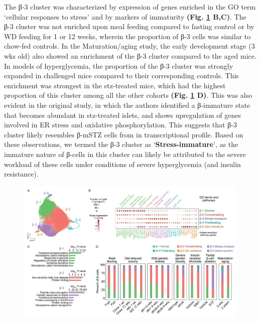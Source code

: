 The β-3 cluster was characterized by expression of genes enriched in the GO term `cellular responses to stress' and by markers of immaturity \textbf{(Fig. \ref{fig:3-4} B,C)}. The β-3 cluster was not enriched upon meal feeding compared to fasting control or by WD feeding for 1 or 12 weeks, wherein the proportion of β-3 cells was similar to chow-fed controls. In the Maturation/aging study, the early development stage (3 wks old) also showed an enrichment of the β-3 cluster compared to the aged mice. In models of hyperglycemia, the proportion of the β-3 cluster was strongly expanded in challenged mice compared to their corresponding controls. This enrichment was strongest in the \gls{stz}-treated mice, which had the highest proportion of this cluster among all the other cohorts \textbf{(Fig. \ref{fig:3-4} D)}. This was also evident in the original study, in which the authors identified a β-immature state that becomes abundant in \gls{stz}-treated islets, and shows upregulation of genes involved in ER stress and oxidative phosphorylation. This suggests that β-3 cluster likely resembles β-mSTZ cells from \textbf{\cite{sachs_targeted_2020}} in transcriptional profile. Based on these observations, we termed the β-3 cluster as ‘\textbf{Stress-immature}’, as the immature nature of β-cells in this cluster can likely be attributed to the severe workload of these cells under conditions of severe hyperglycemia (and insulin resistance).\\

\begin{figure}[t]
\centering
\includegraphics[width=\linewidth]{Chapter5/Fig/F3-1-v2-03.png}
\caption[Characterization of β-cell heterogeneity using subset-
enriched markers]{}
\label{fig:3-4}
\end{figure}

